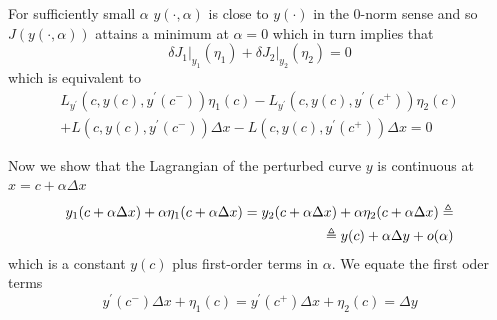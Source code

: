 \documentclass{beamer}
\begin{document}
    \begin{frame}
        For sufficiently small $\alpha$ \(y(\cdot,\alpha)\) is close to $y(\cdot)$ in the 0-norm sense and so $J(y(\cdot,\alpha))$ attains a minimum at $\alpha=0$ which in turn implies that
        \begin{equation*}
            \delta \left. J _ { 1 } \right| _ { y _ { 1 } } \left( \eta _ { 1 } \right) + \delta \left. J _ { 2 } \right| _ { y _ { 2 } } \left( \eta _ { 2 } \right) = 0
        \end{equation*}
        which is equivalent to
        \begin{equation*}
            \begin{split}
                L _ { y ^ { \prime } } \left( c , y ( c ) , y ^ { \prime } \left( c ^ { - } \right) \right) \eta _ { 1 } ( c ) - L _ { y ^ { \prime } } \left( c , y ( c ) , y ^ { \prime } \left( c ^ { + } \right) \right) \eta _ { 2 } ( c )\\
                + L \left( c , y ( c ) , y ^ { \prime } \left( c ^ { - } \right) \right) \Delta x - L \left( c , y ( c ) , y ^ { \prime } \left( c ^ { + } \right) \right) \Delta x = 0
            \end{split}
        \end{equation*}
    \end{frame}
    \begin{frame}
        Now we show that the Lagrangian of the perturbed curve $y$ is continuous at $x = c + \alpha \Delta x$
        \begin{equation*}
            \begin{split}
                y _ { 1 } ( c + \alpha \Delta x ) + \alpha \eta _ { 1 } ( c + \alpha \Delta x ) = y _ { 2 } ( c + \alpha \Delta x ) + \alpha \eta _ { 2 } ( c + \alpha \Delta x ) \triangleq \\                 \triangleq y(c) + \alpha \Delta y + o(\alpha)
            \end{split}
        \end{equation*}
        which is a constant $y(c)$ plus first-order terms in $\alpha$. We equate the first oder terms
        \begin{equation*}
        y ^ { \prime } \left( c ^ { - } \right) \Delta x + \eta _ { 1 } ( c ) = y ^ { \prime } \left( c ^ { + } \right) \Delta x + \eta _ { 2 } ( c ) = \Delta y
        \end{equation*}
    \end{frame}
\end{document}
